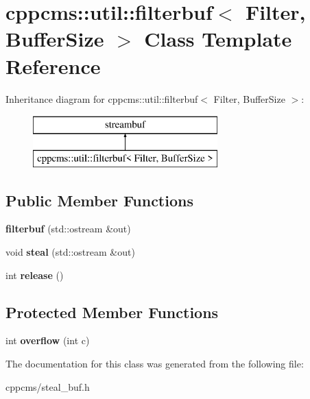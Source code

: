 \section{cppcms\+:\+:util\+:\+:filterbuf$<$ Filter, Buffer\+Size $>$ Class Template Reference}
\label{classcppcms_1_1util_1_1filterbuf}
Inheritance diagram for cppcms\+:\+:util\+:\+:filterbuf$<$ Filter, Buffer\+Size $>$\+:\begin{figure}[H]
\begin{center}
\leavevmode
\includegraphics[height=2.000000cm]{classcppcms_1_1util_1_1filterbuf}
\end{center}
\end{figure}
\subsection*{Public Member Functions}
\begin{DoxyCompactItemize}
\item 
{\bfseries filterbuf} (std\+::ostream \&out)\label{classcppcms_1_1util_1_1filterbuf_ada8198a7f37907e26dbfb6d899cf5e79}

\item 
void {\bfseries steal} (std\+::ostream \&out)\label{classcppcms_1_1util_1_1filterbuf_aed458d9c98e96c6a7e1999c6b76e84e5}

\item 
int {\bfseries release} ()\label{classcppcms_1_1util_1_1filterbuf_a2185cd8578646eba289b6e6e7c2307a1}

\end{DoxyCompactItemize}
\subsection*{Protected Member Functions}
\begin{DoxyCompactItemize}
\item 
int {\bfseries overflow} (int c)\label{classcppcms_1_1util_1_1filterbuf_ab69ae3aee7bb1a420317c9971f73ddbd}

\end{DoxyCompactItemize}


The documentation for this class was generated from the following file\+:\begin{DoxyCompactItemize}
\item 
cppcms/steal\+\_\+buf.\+h\end{DoxyCompactItemize}
